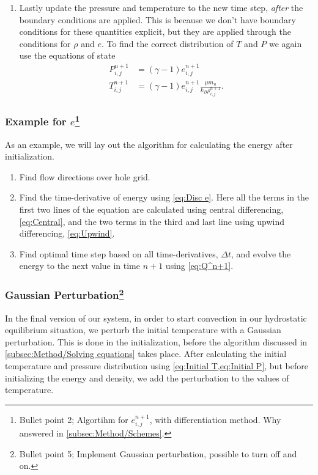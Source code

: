 \documentclass[11pt,a4paper,twocolumn,titlepage]{article}
\begin{document}
\begin{enumerate}
\item Lastly update the pressure and temperature to the new time step, \textit{after} the boundary conditions are applied. This is because we don't have boundary conditions for these quantities explicit, but they are applied through the conditions for $\rho$ and $e$. To find the correct distribution of $T$ and $P$ we again use the equations of state
\begin{equation}
\begin{aligned}
P_{i,j}^{n+1} &= (\gamma-1)e_{i,j}^{n+1}
\\
T_{i,j}^{n+1} &= (\gamma-1)e_{i,j}^{n+1} \frac{\mu m_u }{k_B\rho_{i,j}^{n+1}}.
\end{aligned}
\label{eq:T and P n+1}
\end{equation}
\end{enumerate}

\subsubsection[Example for $e$]{Example for $e$\protect\footnote{Bullet point 2; Algortihm for $e_{i,j}^{n+1}$, with differentiation method. Why answered in \cref{subsec:Method/Schemes}.}}\label{subsubsec:Method/Example w and e}
As an example, we will lay out the algorithm for calculating the energy after initialization.
\begin{enumerate}
\item Find flow directions over hole grid.

\item Find the time-derivative of energy using \cref{eq:Disc e}. Here all the terms in the first two lines of the equation are calculated using central differencing, \cref{eq:Central}, and the two terms in the third and last line using upwind differencing, \cref{eq:Upwind}.

\item Find optimal time step based on all time-derivatives, $\Delta t$, and evolve the energy to the next value in time $n+1$ using \cref{eq:Q^n+1}.
\end{enumerate}

\subsubsection[Gaussian Perturbation]{Gaussian Perturbation\protect\footnote{Bullet point 5; Implement Gaussian perturbation, possible to turn off and on.}}\label{subsubsec:Method/Gaussian perturbation}
In the final version of our system, in order to start convection in our hydrostatic equilibrium situation, we perturb the initial temperature with a Gaussian perturbation. This is done in the initialization, before the algorithm discussed in \cref{subsec:Method/Solving equations} takes place. After calculating the initial temperature and pressure distribution using \cref{eq:Initial T,eq:Initial P}, but before initializing the energy and density, we add the perturbation to the values of temperature.
\end{document}
